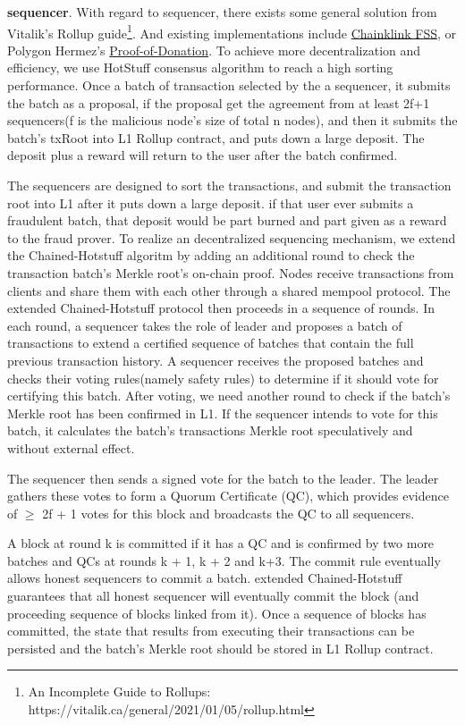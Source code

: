 \documentclass{article}
\begin{document}
\noindent\textbf{sequencer}. With regard to sequencer, there exists some general solution from Vitalik's Rollup guide\footnote{An Incomplete Guide to Rollups: https://vitalik.ca/general/2021/01/05/rollup.html}. And existing implementations include \href{https://blog.chain.link/chainlink-fair-sequencing-services-enabling-a-provably-fair-defi-ecosystem/}{Chainklink FSS}, or Polygon Hermez's \href{https://blog.hermez.io/introducing-proof-of-donation/}{Proof-of-Donation}. To achieve more decentralization and efficiency, we use HotStuff \cite{yin2018hotstuff} consensus algorithm to reach a high sorting performance.  Once a batch of transaction selected by the a sequencer, it submits the batch as a proposal, if the proposal get the agreement from at least 2f+1 sequencers(f is the malicious node's size of total n nodes), and then it submits the batch's txRoot into L1 Rollup contract, and puts down a large deposit. The deposit plus a reward will return to the user after the batch confirmed.

The sequencers are designed to sort the transactions, and submit the transaction root into L1 after it puts down a large deposit. if that user ever submits a fraudulent batch, that deposit would be part burned and part given as a reward to the fraud prover. To realize an decentralized sequencing mechanism, we extend the Chained-Hotstuff algoritm by adding an additional round to check the transaction batch's Merkle root's on-chain proof. Nodes receive transactions from clients and share them with each other through a shared mempool protocol. The extended Chained-Hotstuff protocol then proceeds in a sequence of rounds. In each round, a sequencer takes the role of leader and proposes a batch of transactions to extend a certified sequence of batches that contain the full previous transaction history. A sequencer receives the proposed batches and checks their voting rules(namely safety rules) to determine if it should vote for certifying this batch. After voting, we need another round to check if the batch's Merkle root has been confirmed in L1. If the sequencer intends to vote for this batch, it calculates the batch’s transactions Merkle root speculatively and without external effect. 

The sequencer then sends a signed vote for the batch to the leader. The leader gathers these votes to form a Quorum Certificate (QC), which provides evidence of $\ge$ 2f + 1 votes for this block and broadcasts the QC to all sequencers.

A block at round k is committed if it has a QC and is confirmed by two more batches and QCs at rounds k + 1, k + 2 and k+3. The commit rule eventually allows honest sequencers to commit a batch. extended Chained-Hotstuff guarantees that all honest sequencer will eventually commit the block (and proceeding sequence of blocks linked from it). Once a sequence of blocks has committed, the state that results from executing their transactions can be persisted and the batch's Merkle root should be stored in L1 Rollup contract.
\end{document}
